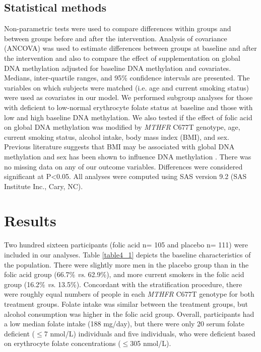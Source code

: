 \subsection{Statistical methods} %
\noindent Non-parametric tests were used to compare differences within groups and between groups before and after the intervention. Analysis of covariance (ANCOVA) was used to estimate differences between groups at baseline and after the intervention and also to compare the effect of supplementation on global DNA methylation adjusted for baseline DNA methylation and covariates. Medians, inter-quartile ranges, and 95\% confidence intervals are presented. The variables on which subjects were matched (i.e. age and current smoking status) were used as covariates in our model. We performed subgroup analyses for those with deficient to low-normal erythrocyte folate status at baseline and those with low and high baseline DNA methylation. We also tested if the effect of folic acid on global DNA methylation was modified by \emph{MTHFR} C677T genotype, age, current smoking status, alcohol intake, body mass index (BMI), and sex. Previous literature suggests that BMI may be associated with global DNA methylation \cite{c429,c430} and sex has been shown to influence DNA methylation \cite{c431,c432,c433}. There was no missing data on any of our outcome variables. Differences were considered significant at P<0.05. All analyses were computed using SAS version 9.2 (SAS Institute Inc., Cary, NC). 
 
\section{Results} %
\noindent Two hundred sixteen participants (folic acid n= 105 and placebo n= 111) were included in our analyses. Table \ref{table4_1} depicts the baseline characteristics of the population. There were slightly more men in the placebo group than in the folic acid group (66.7\% \emph{vs}. 62.9\%), and more current smokers in the folic acid group (16.2\% \emph{vs}. 13.5\%). Concordant with the stratification procedure, there were roughly equal numbers of people in each \emph{MTHFR} C677T genotype for both treatment groups. Folate intake was similar between the treatment groups, but alcohol consumption was higher in the folic acid group. Overall, participants had a low median folate intake (188 mg/day), but there were only 20 serum folate deficient ($\leq$7 nmol/L) individuals and five individuals, who were deficient based on erythrocyte folate concentrations ($\leq$305 nmol/L).
 
